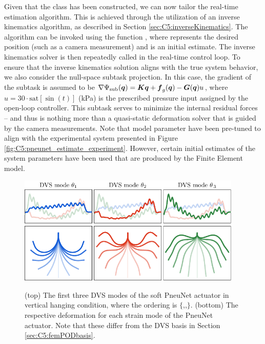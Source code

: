 Given that the  class has been constructed, we can now tailor the real-time estimation algorithm. This is achieved through the utilization of an inverse kinematics algorithm, as described in Section \ref{sec:C5:inverseKinematics}. The algorithm can be invoked using the function , where  represents the desired position (such as a camera measurement) and  is an initial estimate. The inverse kinematics solver is then repeatedly called in the real-time control loop. To ensure that the inverse kinematics solution aligns with the true system behavior, we also consider the null-space subtask projection. In this case, the gradient of the subtask is assumed to be $\nabla \Psi_{\textrm{sub}}({\boldsymbol{q}}) = {\boldsymbol{K}} {\boldsymbol{q}} + {\boldsymbol{f}}_g({\boldsymbol{q}}) - {\boldsymbol{G}}({\boldsymbol{q}}) u$, where $u = 30 \cdot \textrm{sat}\left[ \sin(t) \right]$ (\si{\kilo \pascal}) is the prescribed pressure input assigned by the open-loop controller. This subtask serves to minimize the internal residual forces -- and thus is nothing more than a quasi-static deformation solver that is guided by the camera measurements. Note that model parameter have been pre-tuned to align with the experimental system presented in Figure \ref{fig:C5:pneunet_estimate_experiment}. However, certain initial estimates of the system parameters have been used that are produced by the Finite Element model.

\begin{figure}[!t]
    \centering
    \includegraphics*[width=0.95\textwidth]{./pdf/thesis-figure-6-32-1.pdf} \\[0.25em]
    \includegraphics*[width=0.95\textwidth]{./pdf/thesis-figure-6-32-2.pdf}
    \caption{\small (top) The first three DVS modes of the soft PneuNet actuator in vertical hanging condition, where the ordering is $\{$,,$\}$. (bottom) The respective deformation for each strain mode of the PneuNet actuator. Note that these differ from the DVS basis in Section \ref{sec:C5:femPODbasis}.}
    \label{fig:C5:pneunet_modes_fem}
    \vspace{-3mm}
\end{figure}

